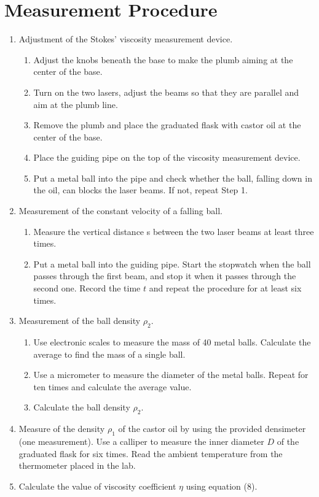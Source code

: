 \documentclass[12pt]{article}
\begin{document}
\section{Measurement Procedure}
\begin{enumerate}
\item Adjustment of the Stokes' viscosity measurement device.
\begin{enumerate}[(1)]
\item Adjust the knobs beneath the base to make the plumb aiming at the center of
the base.
\item Turn on the two lasers, adjust the beams so that they are parallel and aim at
the plumb line.
\item Remove the plumb and place the graduated flask with castor oil at the center of the base.
\item Place the guiding pipe on the top of the viscosity measurement device.
\item Put a metal ball into the pipe and check whether the ball, falling down in the
oil, can blocks the laser beams. If not, repeat Step 1.
\end{enumerate}
\item Measurement of the constant velocity of a falling ball.
\begin{enumerate}[(1)]
\item Measure the vertical distance s between the two laser beams at least three times.
\item Put a metal ball into the guiding pipe. Start the stopwatch when the ball
passes through the first beam, and stop it when it passes through the second
one. Record the time $t$ and repeat the procedure for at least six times.
\end{enumerate}
\item Measurement of the ball density $\rho_2$.
\begin{enumerate}[(1)]
\item Use electronic scales to measure the mass of 40 metal balls. Calculate the
average to find the mass of a single ball.
\item Use a micrometer to measure the diameter of the metal balls. Repeat for ten
times and calculate the average value.
\item Calculate the ball density $\rho_2$.
\end{enumerate}
\item Measure of the density $\rho_1$ of the castor oil by using the provided densimeter (one measurement). Use a calliper to measure the inner diameter $D$ of the graduated flask for six times. Read the ambient temperature from the thermometer placed in the lab.
\item Calculate the value of viscosity coefficient $\eta$ using equation (8).
\end{enumerate}
\end{document}
